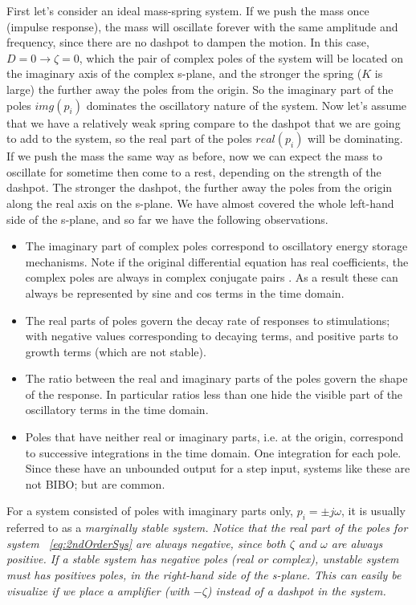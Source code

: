 \documentclass[12pt]{article}
\begin{document}
First let's consider an ideal mass-spring system.  If we push the mass
once (impulse response), the mass will oscillate
forever with the same amplitude and frequency, since there are no
dashpot to dampen the motion.  In this case, $D=0 \rightarrow \zeta
=0$, which the pair of complex poles of the system will be located on
the imaginary axis of the complex s-plane, and the stronger the spring
($K$ is large) the further away the poles from the origin. So the
imaginary part of the poles $img(p_i)$ dominates the oscillatory nature of the
system. Now let's assume that we have a relatively weak spring compare
to the dashpot that we are going to add to the system, so the real
part of the poles $real(p_i)$ will be dominating.  If we push the mass
the same way as before, now we can expect the mass to oscillate for
sometime then come to a rest, depending on the strength of the
dashpot.  The stronger the dashpot, the further away the poles from
the origin along the real axis on the s-plane.  We have almost covered
the whole left-hand side of the s-plane, and so far we have the following
observations.

\begin{itemize}
  \item The imaginary part of complex poles correspond to oscillatory energy storage
    mechanisms. Note if the original differential equation has real coefficients, 
    the complex poles are always in complex conjugate pairs .  As a result
    these can always be represented by sine and cos terms in the time domain.
  \item The real parts of poles govern the decay rate of responses to 
    stimulations; with negative values corresponding to decaying terms, and positive
    parts to growth terms (which are not stable).
  \item The ratio between the real and imaginary parts of the poles govern the shape of the
   response.  In particular ratios less than one hide the visible part of the oscillatory terms in the
   time domain.
  \item Poles that have neither real or imaginary parts, i.e. at the origin, 
    correspond to successive integrations in the time domain.  One integration for 
    each pole.  Since these have an unbounded output for a step input, systems like these are 
    not BIBO; but are common.
\end{itemize}

For a system consisted of poles with imaginary parts only, $p_i = \pm
j \omega$, it is usually referred to as a \em{marginally stable
  system}. Notice that the real part of the poles for system
~\ref{eq:2ndOrderSys} are always negative, since both $\zeta$ and
$\omega$ are always positive. If a stable system has negative poles
(real or complex), unstable system must has positives poles, in the
right-hand side of the s-plane.  This can easily be visualize if we
place a amplifier (with $-\zeta$) instead of a dashpot in the system. 

\end{document}
